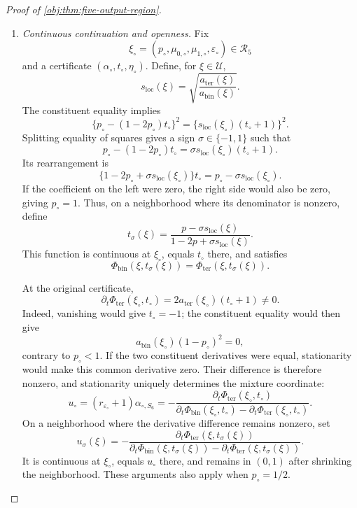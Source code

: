 \documentclass[11pt]{article}
\begin{document}
\begin{proof}[Proof of \cref{obj:thm:five-output-region}]
\begin{enumerate}
\item \textit{Continuous continuation and openness.}
Fix
\[
\xi_\circ=(p_\circ,\mu_{0,\circ},\mu_{1,\circ},\varepsilon_\circ)
\in\mathcal R_5
\]
and a certificate \((\alpha_\circ,t_\circ,\eta_\circ)\).
Define, for \(\xi\in\mathcal U\),
\[
s_{\mathrm{loc}}(\xi)
=
\sqrt{\frac{a_{\mathrm{ter}}(\xi)}{a_{\mathrm{bin}}(\xi)}}.
\]
The constituent equality implies
\[
\{p_\circ-(1-2p_\circ)t_\circ\}^2
=
\{s_{\mathrm{loc}}(\xi_\circ)(t_\circ+1)\}^2.
\]
Splitting equality of squares gives a sign
\(\sigma\in\{-1,1\}\) such that
\[
p_\circ-(1-2p_\circ)t_\circ
=
\sigma s_{\mathrm{loc}}(\xi_\circ)(t_\circ+1).
\]
Its rearrangement is
\[
\{1-2p_\circ+\sigma s_{\mathrm{loc}}(\xi_\circ)\}t_\circ
=
p_\circ-\sigma s_{\mathrm{loc}}(\xi_\circ).
\]
If the coefficient on the left were zero, the right side would also be
zero, giving \(p_\circ=1\). Thus, on a neighborhood where its denominator
is nonzero, define
\[
t_\sigma(\xi)
=
\frac{p-\sigma s_{\mathrm{loc}}(\xi)}
     {1-2p+\sigma s_{\mathrm{loc}}(\xi)}.
\]
This function is continuous at \(\xi_\circ\), equals \(t_\circ\) there,
and satisfies
\[
\Phi_{\mathrm{bin}}(\xi,t_\sigma(\xi))
=
\Phi_{\mathrm{ter}}(\xi,t_\sigma(\xi)).
\]

At the original certificate,
\[
\partial_t\Phi_{\mathrm{ter}}(\xi_\circ,t_\circ)
=
2a_{\mathrm{ter}}(\xi_\circ)(t_\circ+1)\ne0.
\]
Indeed, vanishing would give \(t_\circ=-1\); the constituent equality
would then give
\[
a_{\mathrm{bin}}(\xi_\circ)(1-p_\circ)^2=0,
\]
contrary to \(p_\circ<1\).
If the two constituent derivatives were equal, stationarity would make
this common derivative zero. Their difference is therefore nonzero, and
stationarity uniquely determines the mixture coordinate:
\[
u_\circ=(r_{\varepsilon_\circ}+1)\alpha_{\circ,S_6}
=
-\frac{\partial_t\Phi_{\mathrm{ter}}(\xi_\circ,t_\circ)}
       {\partial_t\Phi_{\mathrm{bin}}(\xi_\circ,t_\circ)
        -\partial_t\Phi_{\mathrm{ter}}(\xi_\circ,t_\circ)}.
\]
On a neighborhood where the derivative difference remains nonzero, set
\[
u_\sigma(\xi)
=
-\frac{\partial_t\Phi_{\mathrm{ter}}(\xi,t_\sigma(\xi))}
       {\partial_t\Phi_{\mathrm{bin}}(\xi,t_\sigma(\xi))
        -\partial_t\Phi_{\mathrm{ter}}(\xi,t_\sigma(\xi))}.
\]
It is continuous at \(\xi_\circ\), equals \(u_\circ\) there, and remains in
\((0,1)\) after shrinking the neighborhood. These arguments also apply
when \(p_\circ=1/2\).


\end{enumerate}
\end{proof}
\end{document}
